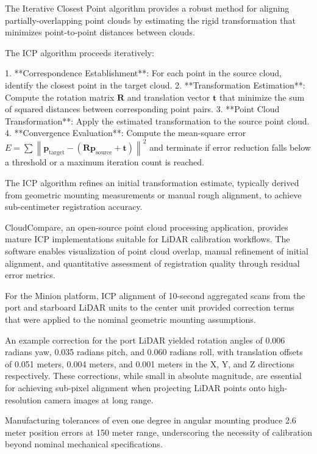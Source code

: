 \documentclass{erauthesis}
\begin{document}

The Iterative Closest Point algorithm provides a robust method for aligning partially-overlapping point clouds by estimating the rigid transformation that minimizes point-to-point distances between clouds.

The ICP algorithm proceeds iteratively:

1. **Correspondence Establishment**: For each point in the source cloud, identify the closest point in the target cloud.
2. **Transformation Estimation**: Compute the rotation matrix $\mathbf{R}$ and translation vector $\mathbf{t}$ that minimize the sum of squared distances between corresponding point pairs.
3. **Point Cloud Transformation**: Apply the estimated transformation to the source point cloud.
4. **Convergence Evaluation**: Compute the mean-square error $E = \sum \left\| \mathbf{p}_{\text{target}} - (\mathbf{R} \mathbf{p}_{\text{source}} + \mathbf{t}) \right\|^2$ and terminate if error reduction falls below a threshold or a maximum iteration count is reached.

The ICP algorithm refines an initial transformation estimate, typically derived from geometric mounting measurements or manual rough alignment, to achieve sub-centimeter registration accuracy.

CloudCompare, an open-source point cloud processing application, provides mature ICP implementations suitable for LiDAR calibration workflows.
The software enables visualization of point cloud overlap, manual refinement of initial alignment, and quantitative assessment of registration quality through residual error metrics.

For the Minion platform, ICP alignment of 10-second aggregated scans from the port and starboard LiDAR units to the center unit provided correction terms that were applied to the nominal geometric mounting assumptions.

An example correction for the port LiDAR yielded rotation angles of 0.006 radians yaw, 0.035 radians pitch, and 0.060 radians roll, with translation offsets of 0.051 meters, 0.004 meters, and 0.001 meters in the X, Y, and Z directions respectively.
These corrections, while small in absolute magnitude, are essential for achieving sub-pixel alignment when projecting LiDAR points onto high-resolution camera images at long range.

Manufacturing tolerances of even one degree in angular mounting produce 2.6 meter position errors at 150 meter range, underscoring the necessity of calibration beyond nominal mechanical specifications.
\end{document}

